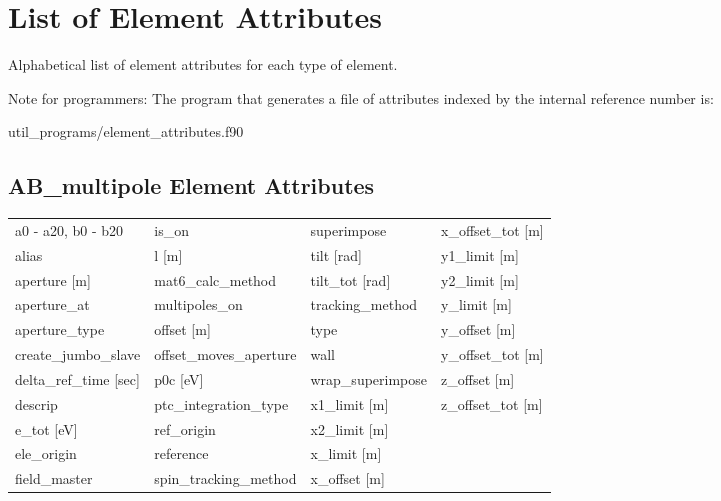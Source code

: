 \chapter{List of Element Attributes}
\label{c:attrib.list}

Alphabetical list of element attributes for each type of element. 

Note for programmers: The program that generates a file of attributes indexed by the
internal reference number is:
\begin{example}
  util_programs/element_attributes.f90 
\end{example}

 \section{AB_multipole Element Attributes}
 \label{s:list.ab.multipole}
 
 \begin{tabular}{llll} \toprule
a0 - a20, b0 - b20               & is_on                            & superimpose                      & x_offset_tot [m]                 \\
alias                            & l [m]                            & tilt [rad]                       & y1_limit [m]                     \\
aperture [m]                     & mat6_calc_method                 & tilt_tot [rad]                   & y2_limit [m]                     \\
aperture_at                      & multipoles_on                    & tracking_method                  & y_limit [m]                      \\
aperture_type                    & offset [m]                       & type                             & y_offset [m]                     \\
create_jumbo_slave               & offset_moves_aperture            & wall                             & y_offset_tot [m]                 \\
delta_ref_time [sec]             & p0c [eV]                         & wrap_superimpose                 & z_offset [m]                     \\
descrip                          & ptc_integration_type             & x1_limit [m]                     & z_offset_tot [m]                 \\
e_tot [eV]                       & ref_origin                       & x2_limit [m]                     &                                  \\
ele_origin                       & reference                        & x_limit [m]                      &                                  \\
field_master                     & spin_tracking_method             & x_offset [m]                     &                                  \\
 \bottomrule
 \end{tabular}
 \vfill
 
